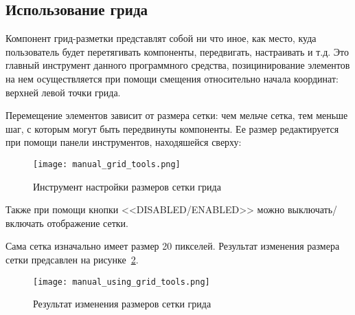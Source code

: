 \subsection{Использование грида}
\label{sec:manual:grid_manual}

Компонент грид-разметки представлят собой ни что иное, как место, куда пользователь будет перетягивать компоненты, передвигать, настраивать и т.д. Это главный инструмент данного программного средства, позицинирование элементов на нем осуществляется при помощи смещения относительно начала координат: верхней левой точки грида.

Перемещение элементов зависит от размера сетки: чем мельче сетка, тем меньше шаг, с которым могут быть передвинуты компоненты. Ее размер редактируется при помощи панели инструментов, находяшейся сверху:

\begin{figure}[ht]
  \centering
    \texttt{[image: manual\_grid\_tools.png]}
    \caption{Инструмент настройки размеров сетки грида}
    \label{sec:manual:manual_grid_tools}
\end{figure}

Также при помощи кнопки <<DISABLED/ENABLED>> можно выключать/включать отображение сетки.

Сама сетка изначально имеет размер 20 пикселей. Результат изменения размера сетки предсавлен на рисунке~\ref{sec:manual:manual_using_grid_tools}.

\begin{figure}[ht]
  \centering
    \texttt{[image: manual\_using\_grid\_tools.png]}
    \caption{Результат изменения размеров сетки грида}
    \label{sec:manual:manual_using_grid_tools}
\end{figure}


